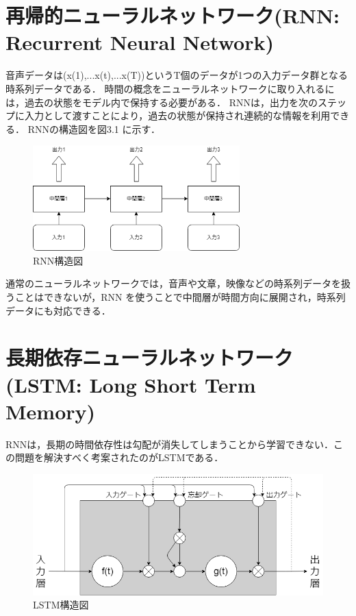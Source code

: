 \documentclass{jreport}		%
\begin{document}
\section{再帰的ニューラルネットワーク(RNN: Recurrent Neural Network)}
音声データは(x(1),...x(t),...x(T))というT個のデータが1つの入力データ群となる時系列データである．
時間の概念をニューラルネットワークに取り入れるには，過去の状態をモデル内で保持する必要がある．
RNNは，出力を次のステップに入力として渡すことにより，過去の状態が保持され連続的な情報を利用できる．\cite{RNN}
RNNの構造図を図3.1 に示す．

\begin{figure}[htbp]
 \begin{center}
  \includegraphics[width=80mm]{RNN.png}
 \end{center}
 \caption{RNN構造図}
 \label{fig:one}
\end{figure}

通常のニューラルネットワークでは，音声や文章，映像などの時系列データを扱うことはできないが，RNN を使うことで中間層が時間方向に展開され，時系列データにも対応できる．

\section{長期依存ニューラルネットワーク(LSTM: Long Short Term Memory)}
RNNは，長期の時間依存性は勾配が消失してしまうことから学習できない．この問題を解決すべく考案されたのがLSTMである．
\newpage

\begin{figure}[htbp]
 \begin{center}
  \includegraphics[width=120mm]{LSTM.png}
 \end{center}
 \caption{LSTM構造図}
 \label{fig:one}
\end{figure}
\end{document}
